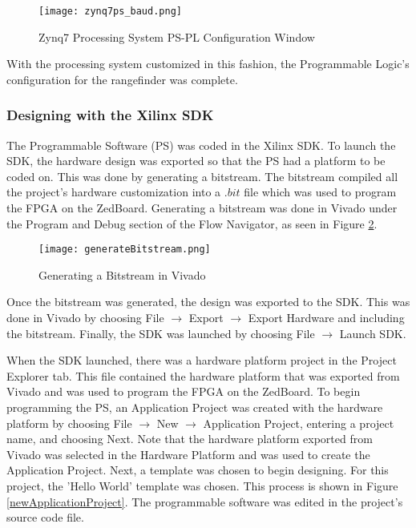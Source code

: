 \begin{figure}[H]
	\centerline{\texttt{[image: zynq7ps\_baud.png]}}
	\caption{Zynq7 Processing System PS-PL Configuration Window}
	\label{zynq7ps_baud_pic}
\end{figure}

With the processing system customized in this fashion, the Programmable Logic's configuration for the rangefinder was complete.

\subsubsection{Designing with the Xilinx SDK}
The Programmable Software (PS) was coded in the Xilinx SDK. To launch the SDK, the hardware design was exported so that the PS had a platform to be coded on. This was done by generating a bitstream. The bitstream compiled all the project's hardware customization into a $.bit$ file which was used to program the FPGA on the ZedBoard. Generating a bitstream was done in Vivado under the Program and Debug section of the Flow Navigator, as seen in Figure \ref{generateBitstream}.

\begin{figure}[H]
	\centerline{\texttt{[image: generateBitstream.png]}}
	\caption{Generating a Bitstream in Vivado}
	\label{generateBitstream}
\end{figure}

Once the bitstream was generated, the design was exported to the SDK. This was done in Vivado by choosing File $\rightarrow$ Export $\rightarrow$ Export Hardware and including the bitstream. Finally, the SDK was launched by choosing File $\rightarrow$ Launch SDK.
\par
When the SDK launched, there was a hardware platform project in the Project Explorer tab. This file contained the hardware platform that was exported from Vivado and was used to program the FPGA on the ZedBoard. To begin programming the PS, an Application Project was created with the hardware platform by choosing File $\rightarrow$ New $\rightarrow$ Application Project, entering a project name, and choosing Next. Note that the hardware platform exported from Vivado was selected in the Hardware Platform and was used to create the Application Project. Next, a template was chosen to begin designing. For this project, the 'Hello World' template was chosen. This process is shown in Figure \ref{newApplicationProject}. The programmable software was edited in the project's source code file.

